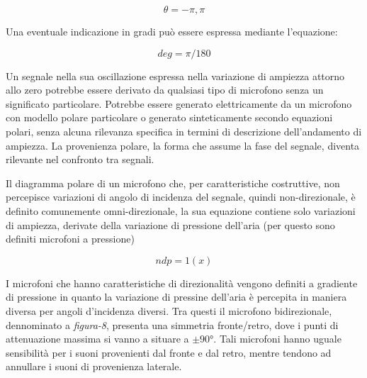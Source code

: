 \begin{equation}
\theta = -\pi,\pi
\label{eq:rad}
\end{equation}

Una eventuale indicazione in gradi può essere espressa mediante l'equazione:

\begin{equation}
deg = \pi/180
\label{eq:deg2rad}
\end{equation}

Un segnale nella sua oscillazione espressa nella variazione di ampiezza
attorno allo zero potrebbe essere derivato da qualsiasi tipo di microfono senza
un significato particolare. Potrebbe essere generato elettricamente da un
microfono con modello polare particolare o generato sinteticamente secondo equazioni polari, senza
alcuna rilevanza specifica in termini di descrizione dell'andamento di ampiezza.
La provenienza polare, la forma che assume la fase del segnale, diventa rilevante nel confronto tra segnali.

Il diagramma polare di un microfono che, per caratteristiche costruttive, non
percepisce variazioni di angolo di incidenza del segnale, quindi non-direzionale,
è definito comunemente omni-direzionale, la sua equazione contiene solo
variazioni di ampiezza, derivate della variazione di pressione dell'aria
(per questo sono definiti microfoni a pressione)

\begin{equation}
ndp = 1(x)
\label{eq:omni}
\end{equation}


I microfoni che hanno caratteristiche di direzionalità vengono definiti a
gradiente di pressione in quanto la variazione di pressine dell'aria è percepita
in maniera diversa per angoli d'incidenza diversi. Tra questi il microfono bidirezionale,
dennominato a \emph{figura-8}, presenta una simmetria fronte/retro, dove i punti di
attenuazione massima si vanno a situare a $\pm90°$. Tali microfoni hanno uguale
sensibilità per i suoni provenienti dal fronte e dal retro, mentre tendono ad
annullare i suoni di provenienza laterale.

